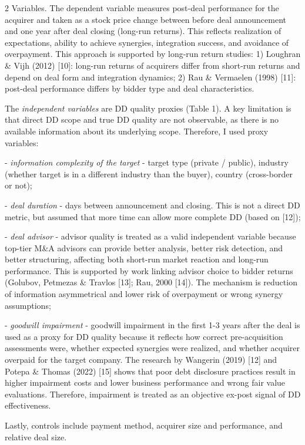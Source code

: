\begin{multicols}{2}
Variables. The dependent variable measures post-deal performance for the
acquirer and taken as a stock price change between before deal
announcement and one year after deal closing (long-run returns). This
reflects realization of expectations, ability to achieve synergies,
integration success, and avoidance of overpayment. This approach is
supported by long-run return studies: 1) Loughran \& Vijh (2012)
{[}10{]}: long-run returns of acquirers differ from short-run returns
and depend on deal form and integration dynamics; 2) Rau \& Vermaelen
(1998) {[}11{]}: post-deal performance differs by bidder type and deal
characteristics.

The \emph{independent variables} are DD quality proxies (Table 1). A key
limitation is that direct DD scope and true DD quality are not
observable, as there is no available information about its underlying
scope. Therefore, I used proxy variables:

- \emph{information complexity of the target} - target type (private /
public), industry (whether target is in a different industry than the
buyer), country (cross-border or not);

- \emph{deal duration} - days between announcement and closing. This is
not a direct DD metric, but assumed that more time can allow more
complete DD (based on {[}12{]});

- \emph{deal advisor} - advisor quality is treated as a valid
independent variable because top-tier M\&A advisors can provide better
analysis, better risk detection, and better structuring, affecting both
short-run market reaction and long-run performance. This is supported by
work linking advisor choice to bidder returns (Golubov, Petmezas \&
Travlos {[}13{]}; Rau, 2000 {[}14{]}). The mechanism is reduction of
information asymmetrical and lower risk of overpayment or wrong synergy
assumptions;

- \emph{goodwill impairment} - goodwill impairment in the first 1-3
years after the deal is used as a proxy for DD quality because it
reflects how correct pre-acquisition assessments were, whether expected
synergies were realized, and whether acquirer overpaid for the target
company. The research by Wangerin (2019) {[}12{]} and Potepa \& Thomas
(2022) {[}15{]} shows that poor debt disclosure practices result in
higher impairment costs and lower business performance and wrong fair
value evaluations. Therefore, impairment is treated as an objective
ex-post signal of DD effectiveness.

Lastly, controls include payment method, acquirer size and performance,
and relative deal size.
\end{multicols}

